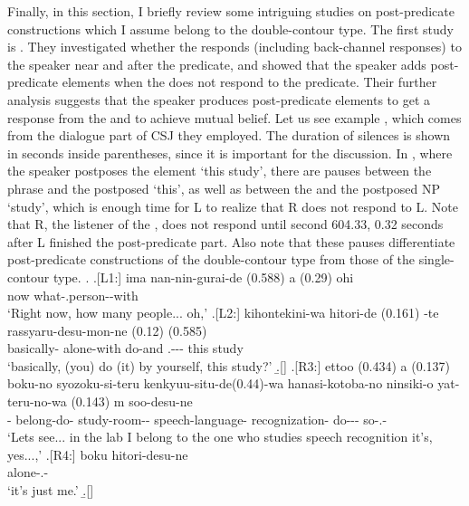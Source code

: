Finally, in this section,
I briefly review some intriguing studies on post-predicate constructions which I assume belong to the double-contour type.
The first study is .
They investigated whether the  responds (including back-channel responses) to the speaker near and after the predicate, and showed that
the speaker adds post-predicate elements
when the  does not respond to the predicate.
Their further analysis suggests that the speaker produces post-predicate elements to get a response from the  and to achieve mutual belief.
Let us see example \Next,
which comes from the dialogue part of CSJ they employed.
The duration of silences is shown in seconds inside parentheses, since it is important for the discussion.
In \Next[-L2], where the speaker postposes the element  `this study',
there are pauses between the  phrase and the postposed   `this', as well as between the  and the postposed NP  `study',
which is enough time for L to realize that
R does not respond to L.
Note that R, the listener of the ,
does not respond until second 604.33,
0.32 seconds after L finished the post-predicate part.
Also note that
these pauses differentiate post-predicate constructions of the double-contour type from those of the single-contour type.
%
\ex.
 \ag.[L1:] ima nan-nin-gurai-de (0.588) a (0.29) ohi \\
           now what-.person--with {}  {}  \\
           `Right now, how many people... oh,'
 \bg.[L2:] kihontekini-wa hitori-de (0.161) -te rassyaru-desu-mon-ne
           (0.12)  (0.585)  \\
           basically- alone-with {} do-and .--- {} this {} study \\
           `basically, (you) do (it) by yourself, this study?'
 \b.[] 
 \bg.[R3:] ettoo (0.434) a (0.137) boku-no syozoku-si-teru kenkyuu-situ-de(0.44)-wa hanasi-kotoba-no ninsiki-o yat-teru-no-wa (0.143) m soo-desu-ne \\
            {}  {} - belong-do- study-room-- speech-language- recognization- do--- {}  so-.- \\
           `Lets see... in the lab I belong to the one who studies speech recognition it's, yes...,'
 \bg.[R4:] boku hitori-desu-ne \\
       alone-.- \\
      `it's just me.'
  \b.[] \hfill{\cite[287]{kakuden12}}


